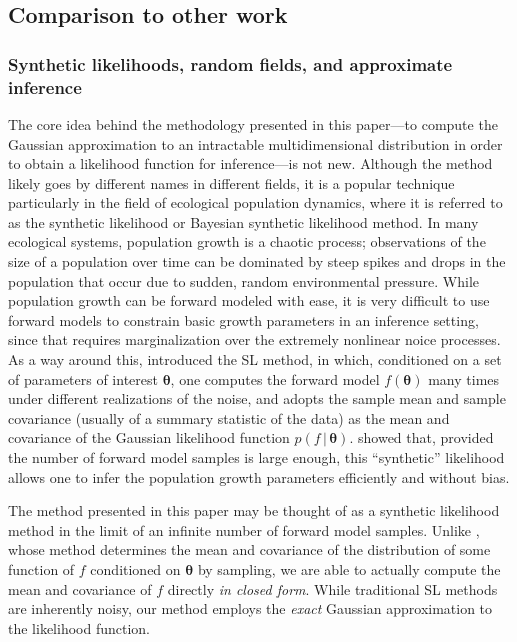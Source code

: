 \documentclass[modern,linenumbers]{aastex62}
\begin{document}
\subsection{Comparison to other work}
\label{sec:other-work}

\subsubsection{Synthetic likelihoods, random fields, and approximate inference}

The core idea behind the methodology presented in this paper---to compute the
Gaussian approximation to an intractable multidimensional distribution in order
to obtain a likelihood function for inference---is not new. Although the
method likely goes by different names in different fields, it is a popular
technique particularly in the field of ecological population dynamics,
where it is referred to as the synthetic likelihood \citep[SL;][]{Wood2010}
or Bayesian synthetic likelihood \citep[BSL;][]{Price2018} method. In many
ecological systems, population growth is a chaotic process; observations of the
size of a population over time can be dominated by steep spikes and drops
in the population that occur due to sudden, random environmental pressure.
While population growth can be forward modeled with ease, it is very
difficult to use forward models to constrain basic growth parameters in an
inference setting, since that requires marginalization over the extremely
nonlinear noice processes. As a way around this, \citet{Wood2010} introduced
the SL method, in which, conditioned on a set of parameters of interest
$\pmb{\theta}$, one computes the forward model $f(\pmb{\theta})$ many times
under different realizations of the noise, and adopts the sample mean
and sample covariance (usually of a summary statistic of the data)
as the mean and covariance of the Gaussian likelihood
function $p(f \, | \, \pmb{\theta})$. \citet{Wood2010} showed that,
provided the number of forward model samples is large enough, this
``synthetic'' likelihood allows one to infer the population growth parameters
efficiently and without bias.

The method presented in this paper may be thought of as a synthetic likelihood
method in the limit of an infinite number of forward model samples. Unlike
\citet{Wood2010}, whose method determines the mean and covariance of the
distribution of some function of $f$ conditioned on $\pmb{\theta}$ by sampling, we are able
to actually compute the mean and covariance of $f$ directly \emph{in closed form}.
While traditional SL methods are inherently noisy, our method employs
the \emph{exact} Gaussian approximation to the likelihood function.
\end{document}
